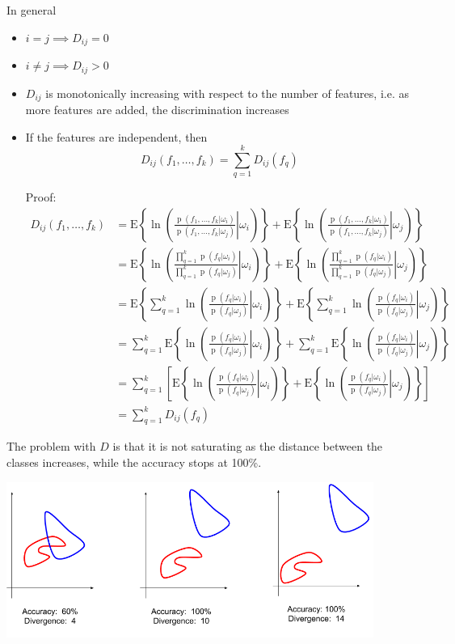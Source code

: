 \documentclass[oneside,onecolumn]{report}
\newcommand{\E}[1]{\text{E} \left\{ #1 \right\}}
\DeclareMathOperator*{\pdf}{p}
\begin{document}
In general
\begin{itemize}
    \item $i = j \implies D_{i j} = 0$
    \item $i \neq j \implies D_{i j} > 0$
    \item $D_{i j}$ is monotonically increasing with respect to the number of features, i.e. as more features are added, the discrimination increases
    \item If the features are independent, then
    $$ D_{i j}(f_1, \dots, f_k) = \sum_{q = 1}^k D_{i j}(f_q) $$

    Proof:
    \begin{align*}
        D_{i j}(f_1, \dots, f_k)
        &=
        \E{\ln( \left. \frac{\pdf(f_1, \dots, f_k | \omega_i)}{\pdf(f_1, \dots, f_k  | \omega_j)} \right| \omega_i)} +
        \E{\ln( \left. \frac{\pdf(f_1, \dots, f_k | \omega_i)}{\pdf(f_1, \dots, f_k  | \omega_j)} \right| \omega_j)} \\
        &=
        \E{\ln( \left. \frac{\prod_{q = 1}^k \pdf(f_q | \omega_i)}{\prod_{q = 1}^k \pdf(f_q | \omega_j)} \right| \omega_i)} +
        \E{\ln( \left. \frac{\prod_{q = 1}^k \pdf(f_q | \omega_i)}{\prod_{q = 1}^k \pdf(f_q | \omega_j)} \right| \omega_j)} \\
        &=
        \E{ \sum_{q = 1}^k \ln( \left. \frac{\pdf(f_q | \omega_i)}{\pdf(f_q | \omega_j)} \right| \omega_i)} +
        \E{ \sum_{q = 1}^k \ln( \left. \frac{\pdf(f_q | \omega_i)}{\pdf(f_q | \omega_j)} \right| \omega_j)} \\
        &=
        \sum_{q = 1}^k \E{ \ln( \left. \frac{\pdf(f_q | \omega_i)}{\pdf(f_q | \omega_j)} \right| \omega_i)} +
        \sum_{q = 1}^k \E{ \ln( \left. \frac{\pdf(f_q | \omega_i)}{\pdf(f_q | \omega_j)} \right| \omega_j)} \\
        &=
        \sum_{q = 1}^k \left[ \E{ \ln( \left. \frac{\pdf(f_q | \omega_i)}{\pdf(f_q | \omega_j)} \right| \omega_i)} +
        \E{ \ln( \left. \frac{\pdf(f_q | \omega_i)}{\pdf(f_q | \omega_j)} \right| \omega_j)} \right] \\
        &= \sum_{q = 1}^k D_{i j}(f_q)
    \end{align*}
\end{itemize}

The problem with $D$ is that it is not saturating as the distance between the classes increases, while the accuracy stops at 100\%.

\begin{center}
    \includegraphics[width=12cm]{non_sasturating_divergence.png}
\end{center}
\end{document}
